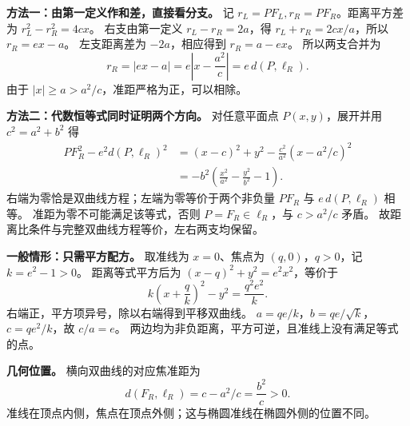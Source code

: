 \clearpage
\begin{proofbox}
\textbf{方法一：由第一定义作和差，直接看分支。}
记 $r_L=PF_L,r_R=PF_R$。距离平方差为 $r_L^2-r_R^2=4cx$。
右支由第一定义 $r_L-r_R=2a$，得 $r_L+r_R=2cx/a$，所以 $r_R=ex-a$。
左支距离差为 $-2a$，相应得到 $r_R=a-ex$。
所以两支合并为
\[
r_R=|ex-a|=e\left|x-\frac{a^2}{c}\right|=e\,d(P,\ell_R).
\]
由于 $|x|\ge a>a^2/c$，准距严格为正，可以相除。

\textbf{方法二：代数恒等式同时证明两个方向。}
对任意平面点 $P(x,y)$，展开并用 $c^2=a^2+b^2$ 得
\[
\begin{aligned}
PF_R^2-e^2d(P,\ell_R)^2
&=(x-c)^2+y^2-\frac{c^2}{a^2}(x-a^2/c)^2\\
&=-b^2\left(\frac{x^2}{a^2}-\frac{y^2}{b^2}-1\right).
\end{aligned}
\]
右端为零恰是双曲线方程；左端为零等价于两个非负量 $PF_R$ 与 $e\,d(P,\ell_R)$ 相等。
准距为零不可能满足该等式，否则 $P=F_R\in\ell_R$，与 $c>a^2/c$ 矛盾。
故距离比条件与完整双曲线方程等价，左右两支均保留。
\end{proofbox}
\clearpage
\begin{proofbox}
\textbf{一般情形：只需平方配方。}
取准线为 $x=0$、焦点为 $(q,0)$，$q>0$，记 $k=e^2-1>0$。
距离等式平方后为 $(x-q)^2+y^2=e^2x^2$，等价于
\[
k\left(x+\frac qk\right)^2-y^2=\frac{q^2e^2}{k}.
\]
右端正，平方项异号，除以右端得到平移双曲线。
$a=qe/k$，$b=qe/\sqrt{k}$，$c=qe^2/k$，故 $c/a=e$。
两边均为非负距离，平方可逆，且准线上没有满足等式的点。

\textbf{几何位置。} 横向双曲线的对应焦准距为
\[
d(F_R,\ell_R)=c-a^2/c=\frac{b^2}{c}>0.
\]
准线在顶点内侧，焦点在顶点外侧；这与椭圆准线在椭圆外侧的位置不同。
\end{proofbox}
\clearpage
